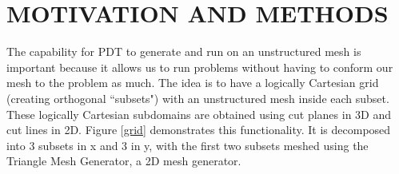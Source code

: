 
\chapter{\uppercase {Motivation and Methods}}
\label{ch:motivation}

The capability for PDT to generate and run on an unstructured mesh is important because it allows us to run problems without having to conform our mesh to the problem as much. The idea is to have a logically Cartesian grid (creating orthogonal ``subsets") with an unstructured mesh inside each subset. These logically Cartesian subdomains are obtained using cut planes in 3D and cut lines in 2D. Figure \ref{grid} demonstrates this functionality. It is decomposed into 3 subsets in x and 3 in y, with the first two subsets meshed using the Triangle Mesh Generator\cite{triangle}, a 2D mesh generator.
\vspace{0.2cm}

